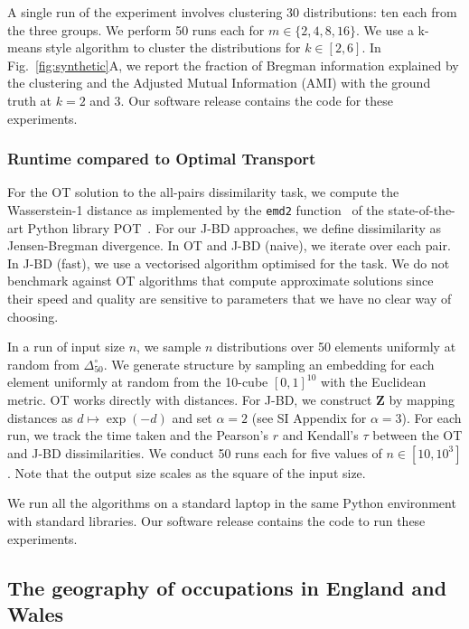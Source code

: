 \documentclass[aps,pre,floats,floatfix,superscriptaddress,twocolumn,final,10pt]{revtex4-2}
\theoremstyle{definition}
\renewcommand{\vec}[1]{\mathbf{#1}}
\begin{document}
A single run of the experiment involves clustering 30 distributions: ten each from the three groups. We perform 50 runs each for $m \in \{ 2,4,8,16\}$. We use a k-means style algorithm to cluster the distributions for $k \in [2,6]$. In Fig.~\ref{fig:synthetic}A, we report the fraction of Bregman information explained by the clustering and the Adjusted Mutual Information (AMI) with the ground truth at $k=2$ and $3$. Our software release contains the code for these experiments.


\subsubsection{Runtime compared to Optimal Transport}

For the {\small OT} solution to the all-pairs dissimilarity task, we compute the Wasserstein-1 distance as implemented by the \texttt{emd2} function~\cite{Bonneel2011} of the state-of-the-art Python library POT~\cite{Flamary2021}. For our {\small J-BD} approaches, we define dissimilarity as Jensen-Bregman divergence. In {\small OT} and {\small J-BD (naive)}, we iterate over each pair. In {\small J-BD (fast)}, we use a vectorised algorithm optimised for the task. We do not benchmark against OT algorithms that compute approximate solutions since their speed and quality are sensitive to parameters that we have no clear way of choosing.

In a run of input size $n$, we sample $n$ distributions over 50 elements uniformly at random from $\Delta_{50}^\circ$. We generate structure by sampling an embedding for each element uniformly at random from the 10-cube $\left[0,1\right]^{10}$ with the Euclidean metric. {\small OT} works directly with distances. For {\small J-BD}, we construct $\vec{Z}$ by mapping distances as $d \mapsto \exp\left(-d\right)$ and set $\alpha=2$ (see SI Appendix for $\alpha=3$). For each run, we track the time taken and the Pearson's $r$ and Kendall's $\tau$ between the {\small OT} and {\small J-BD} dissimilarities. We conduct 50 runs each for five values of $n \in \left[ 10, 10^3 \right]$. Note that the output size scales as the square of the input size.

We run all the algorithms on a standard laptop in the same Python environment with standard libraries. Our software release contains the code to run these experiments.


\subsection{The geography of occupations in England and Wales}
\end{document}
